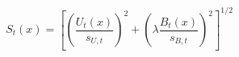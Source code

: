 \[
S_t(x)=\left[\left(\frac{U_t(x)}{s_{U,t}}\right)^2+\left(\lambda\frac{B_t(x)}{s_{B,t}}\right)^2\right]^{1/2}
\]
